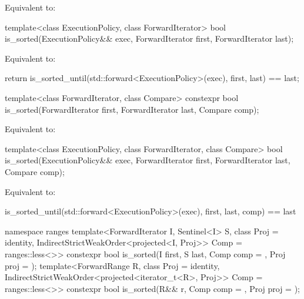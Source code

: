 \begin{itemdescr}
\pnum
\effects
Equivalent to: 
\end{itemdescr}

%
\begin{itemdecl}
template<class ExecutionPolicy, class ForwardIterator>
  bool is_sorted(ExecutionPolicy&& exec,
                 ForwardIterator first, ForwardIterator last);
\end{itemdecl}

\begin{itemdescr}
\pnum
\effects
Equivalent to:
\begin{codeblock}
return is_sorted_until(std::forward<ExecutionPolicy>(exec), first, last) == last;
\end{codeblock}
\end{itemdescr}

%
\begin{itemdecl}
template<class ForwardIterator, class Compare>
  constexpr bool is_sorted(ForwardIterator first, ForwardIterator last,
                           Compare comp);
\end{itemdecl}

\begin{itemdescr}
\pnum
\effects
Equivalent to: 
\end{itemdescr}


%
\begin{itemdecl}
template<class ExecutionPolicy, class ForwardIterator, class Compare>
  bool is_sorted(ExecutionPolicy&& exec,
                 ForwardIterator first, ForwardIterator last,
                 Compare comp);
\end{itemdecl}

\begin{itemdescr}
\pnum
\effects
Equivalent to:
\begin{codeblock}
is_sorted_until(std::forward<ExecutionPolicy>(exec), first, last, comp) == last
\end{codeblock}
\end{itemdescr}

%
\begin{itemdecl}
namespace ranges {
  template<ForwardIterator I, Sentinel<I> S, class Proj = identity,
           IndirectStrictWeakOrder<projected<I, Proj>> Comp = ranges::less<>>
    constexpr bool is_sorted(I first, S last, Comp comp = {}, Proj proj = {});
  template<ForwardRange R, class Proj = identity,
           IndirectStrictWeakOrder<projected<iterator_t<R>, Proj>> Comp = ranges::less<>>
    constexpr bool is_sorted(R&& r, Comp comp = {}, Proj proj = {});
}
\end{itemdecl}

